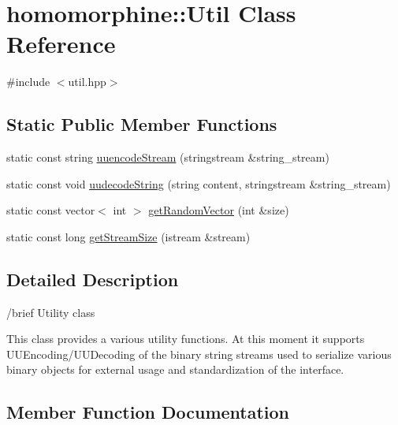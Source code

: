 \hypertarget{classhomomorphine_1_1_util}{}\section{homomorphine\+::Util Class Reference}
\label{classhomomorphine_1_1_util}


{\ttfamily \#include $<$util.\+hpp$>$}

\subsection*{Static Public Member Functions}
\begin{DoxyCompactItemize}
\item 
static const string \mbox{\hyperlink{classhomomorphine_1_1_util_a26f29995aa48f4374993ec4afeca2ac8}{uuencode\+Stream}} (stringstream \&string\+\_\+stream)
\item 
static const void \mbox{\hyperlink{classhomomorphine_1_1_util_aba5af6d7356aca8c70ae4fb1e5d36b70}{uudecode\+String}} (string content, stringstream \&string\+\_\+stream)
\item 
static const vector$<$ int $>$ \mbox{\hyperlink{classhomomorphine_1_1_util_a2dcf1d83028f3d47ba49b80696fefef7}{get\+Random\+Vector}} (int \&size)
\item 
static const long \mbox{\hyperlink{classhomomorphine_1_1_util_acf2321afce14e9c20ca572159592e0e2}{get\+Stream\+Size}} (istream \&stream)
\end{DoxyCompactItemize}


\subsection{Detailed Description}
/brief Utility class

This class provides a various utility functions. At this moment it supports U\+U\+Encoding/\+U\+U\+Decoding of the binary string streams used to serialize various binary objects for external usage and standardization of the interface. 

\subsection{Member Function Documentation}
\mbox{\label{classhomomorphine_1_1_util_a2dcf1d83028f3d47ba49b80696fefef7}} 
